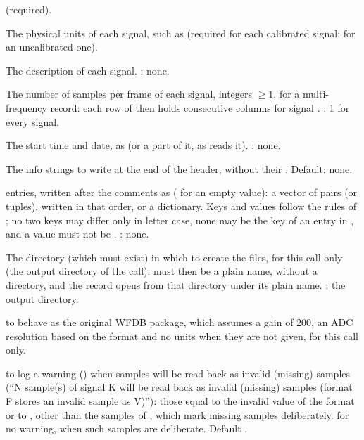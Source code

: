 \begin{params}
  (required).
\item[units] The physical units of each signal, such as  (required for each
  calibrated signal;  for an uncalibrated one).
\item[names] The description of each signal. : none.
\item[samps\_per\_frame] The number of samples per frame of each signal, integers $\ge 1$,
  for a multi-frequency record: each row of  then holds
   consecutive columns for signal . : 1
  for every signal.
\item[base\_time] The start time and date, as  (or a part of
  it, as  reads it). : none.
\item[comments] The info strings to write at the end of the header, without their
  \code{\#}. Default: none.
\item[metadata]  entries, written after the comments as
   ( for an empty value): a vector of  pairs (or  tuples), written in that order, or a dictionary.
  Keys and values follow the rules of ; no two keys may differ only in
  letter case, none may be the key of an entry in , and a value must not be
  . : none.
\item[dir] The directory (which must exist) in which to create the files, for this call
  only (the output directory of the call).  must then be a plain name,
  without a directory, and the record opens from that directory under its plain name.
  : the output directory.
\item[legacy]  to behave as the original WFDB package, which assumes a gain of
  200, an ADC resolution based on the format and no units when they are not given, for
  this call only.
\item[invalid\_warning]  to log a warning () when samples will be
  read back as invalid (missing) samples (``N sample(s) of signal K will be read back as
  invalid (missing) samples (format F stores an invalid sample as V)''): those equal to
  the invalid value of the format or to , other than the
   samples of , which mark missing samples
  deliberately.  for no warning, when such samples are deliberate. Default
  .
\end{params}
